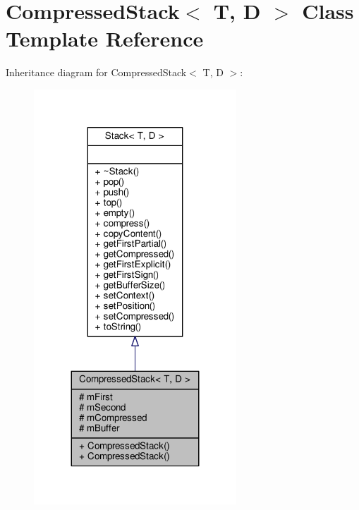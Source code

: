\hypertarget{class_compressed_stack}{}\section{Compressed\+Stack$<$ T, D $>$ Class Template Reference}
\label{class_compressed_stack}


Inheritance diagram for Compressed\+Stack$<$ T, D $>$\+:
\nopagebreak
\begin{figure}[H]
\begin{center}
\leavevmode
\includegraphics[width=215pt]{class_compressed_stack__inherit__graph}
\end{center}
\end{figure}


